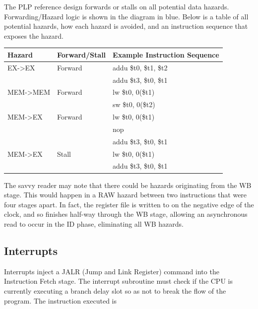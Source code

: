 \documentclass{article}
\begin{document}
The PLP reference design forwards or stalls on all potential data hazards. Forwarding/Hazard logic is shown in the diagram in blue. Below is a table of all potential hazards, how each hazard is avoided, and an instruction sequence that exposes the hazard.

\begin{tabular}{|l | l | l |}
 \hline

 \textbf{Hazard} &	\textbf{Forward/Stall} & \textbf{Example Instruction Sequence} \\ \hline
 EX-\textgreater EX   &  Forward & addu \$t0, \$t1, \$t2                           \\
  					  & 	     & addu  \$t3, \$t0, \$t1                          \\ \hline
 MEM-\textgreater MEM &	 Forward &	lw \$t0, 0(\$t1)                               \\ 
                      &          &  sw \$t0, 0(\$t2)                               \\ \hline
 MEM-\textgreater EX  &	 Forward &	lw \$t0, 0(\$t1)                               \\
                      &          &  nop                                            \\
                      &          &  addu \$t3, \$t0, \$t1                          \\ \hline
 MEM-\textgreater EX  &	 Stall   &	lw \$t0, 0(\$t1)                               \\ 
                      &          &  addu \$t3, \$t0, \$t1				           \\ \hline

\end{tabular}

The savvy reader may note that there could be hazards originating from the WB stage. This would happen in a RAW hazard between two instructions that were four stages apart. In fact, the register file is written to on the negative edge of the clock, and so finishes half-way through the WB stage, allowing an asynchronous read to occur in the ID phase, eliminating all WB hazards.

\subsection{Interrupts}

Interrupts inject a JALR (Jump and Link Register) command into the Instruction Fetch stage.  The interrupt subroutine must check if the CPU is currently executing a branch delay slot so as not to break the flow of the program. The instruction executed is 
\end{document}

